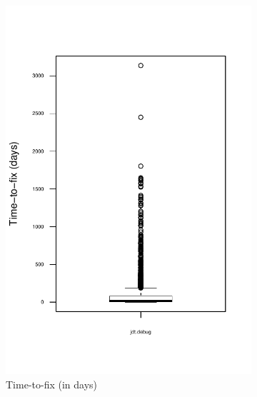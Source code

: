 \begin{figure}
        \begin{subfigure}[b]{0.48\textwidth}
                \centering
                \includegraphics[width=\textwidth]{img/ttf.pdf}
                \caption{Time-to-fix (in days)}
        \end{subfigure}%
        ~ %
        \begin{subfigure}[b]{0.48\textwidth}
                \centering

\end{subfigure}
\end{figure}
